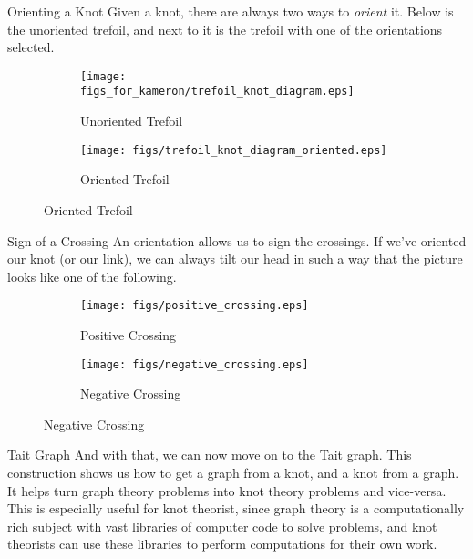 \documentclass{beamer}
\begin{document}
    \begin{frame}{Orienting a Knot}
        Given a knot, there are always two ways to \textit{orient} it.
        Below is the unoriented trefoil, and next to it is the trefoil
        with one of the orientations selected.
        \begin{figure}
            \centering
            \begin{subfigure}[b]{0.49\textwidth}
                \texttt{[image: figs\_for\_kameron/trefoil\_knot\_diagram.eps]}
                \caption{Unoriented Trefoil}
                \label{fig:knot_graph_trefoil_001}
            \end{subfigure}
            \begin{subfigure}[b]{0.49\textwidth}
                \texttt{[image: figs/trefoil\_knot\_diagram\_oriented.eps]}
                \caption{Oriented Trefoil}
                \label{fig:trefoil_knot_diagram_oriented}
            \end{subfigure}
        \end{figure}
    \end{frame}
    \begin{frame}{Sign of a Crossing}
        An orientation allows us to sign the crossings. If we've
        oriented our knot (or our link), we can always tilt our head in
        such a way that the picture looks like one of the following.
        \begin{figure}
            \centering
            \begin{subfigure}[b]{0.49\textwidth}
                \texttt{[image: figs/positive\_crossing.eps]}
                \caption{Positive Crossing}
                \label{fig:positive_crossing}
            \end{subfigure}
            \begin{subfigure}[b]{0.49\textwidth}
                \texttt{[image: figs/negative\_crossing.eps]}
                \caption{Negative Crossing}
                \label{fig:negative_crossing}
            \end{subfigure}
        \end{figure}
    \end{frame}
    \begin{frame}{Tait Graph}
        And with that, we can now move on to the Tait graph.
        This construction shows us how to get a graph from a knot, and a
        knot from a graph. It helps turn graph theory problems into knot theory
        problems and vice-versa. This is especially useful for knot theorist, since
        graph theory is a computationally rich subject with vast libraries of computer
        code to solve problems, and knot theorists can use these libraries to perform
        computations for their own work.
    \end{frame}
\end{document}
